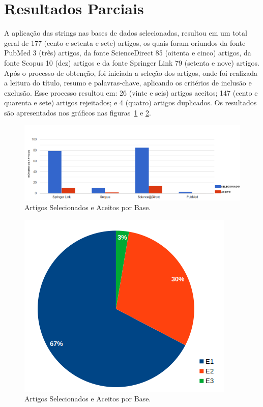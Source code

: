 \documentclass[12pt]{article}
\begin{document}
\section{Resultados Parciais}

A aplicação das strings nas bases de dados selecionadas, resultou em um total geral de 177 (cento e setenta e sete) artigos, os quais foram oriundos da fonte PubMed 3 (três) artigos, da fonte ScienceDirect 85 (oitenta e cinco) artigos, da fonte Scopus 10 (dez) artigos e da fonte Springer Link 79 (setenta e nove) artigos.\\
Após o processo de obtenção, foi iniciada a seleção dos artigos, onde foi realizada a leitura do título, resumo e palavras-chave, aplicando os critérios de inclusão e exclusão. Esse processo resultou em: 26 (vinte e seis) artigos aceitos; 147 (cento e quarenta e sete) artigos rejeitados; e 4 (quatro) artigos duplicados. Os resultados são apresentados nos gráficos nas figuras~\ref{fig:artigoBases} e \ref{fig:excluidosCriterios}.\\


\begin{figure}[tb]
    \centering
    \includegraphics[scale=0.43]{figuras/_artigosAceitosSelecionados.png}
    \caption{Artigos Selecionados e Aceitos por Base.}\label{fig:artigoBases}
\end{figure}

\begin{figure}[tb]
    \centering
    \includegraphics[scale=0.5]{figuras/_artigosExcluidosPorCriterio.png}
    \caption{Artigos Selecionados e Aceitos por Base.}\label{fig:excluidosCriterios}
\end{figure}
\end{document}
